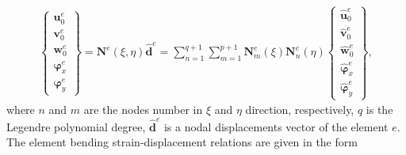 \begin{eqnarray}
	\left \{\begin{array}{c}
		\textbf{u}_0^e\\
		\textbf{v}_0^e\\
		\textbf{w}_0^e\\
		\boldsymbol{\varphi}_x^e\\
		\boldsymbol{\varphi}_y^e
	\end{array} \right\}
	= \textbf{N}^e(\xi,\eta)\widehat{\textbf{d}}^e
	= \sum_{n=1}^{q+1}\sum_{m=1}^{p+1}\textbf{N}_m^e(\xi)\textbf{N}_n^e(\eta)
	\left \{ \begin{array}{c}
		\widehat{\textbf{u}}_0^e \\
		\widehat{\textbf{v}}_0^e \\
		\widehat{\textbf{w}}_0^e \\
		\widehat{\boldsymbol{\varphi}}_x^e \\
		\widehat{\boldsymbol{\varphi}}_y^e
	\end{array} \right \},
\end{eqnarray}
where \(n\) and \(m\) are the nodes number in \(\xi\) and \(\eta\) direction, respectively, \(q\) is the Legendre polynomial degree,  $\widehat{\textbf{d}}^e$ is a nodal displacements vector of the element $e$.
The element bending strain-displacement relations are given in the form
